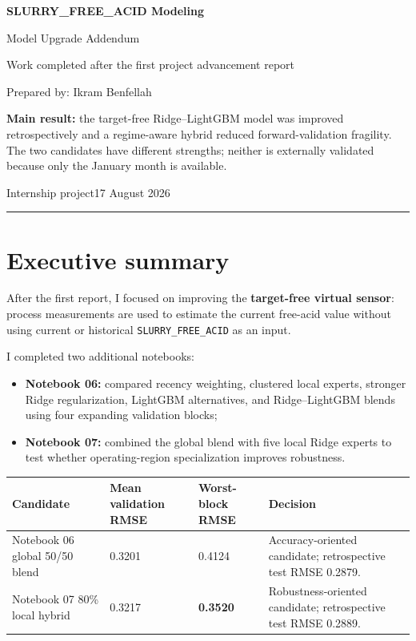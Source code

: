 \documentclass[10pt,a4paper]{article}
\newcommand{\statusbox}[1]{\colorbox{Light}{\parbox{0.96\linewidth}{#1}}
}
\begin{document}
\begin{titlepage}
  \color{Navy}
  \vspace*{2.3cm}
  {\Huge\bfseries SLURRY\_FREE\_ACID Modeling\par}
  \vspace{0.35cm}
  {\LARGE Model Upgrade Addendum\par}
  \vspace{0.7cm}
  {\large Work completed after the first project advancement report\par}
  \vspace{1.0cm}
  {\large Prepared by: Ikram Benfellah\par}
  \vfill
  \statusbox{\textbf{Main result:} the target-free Ridge--LightGBM model was improved retrospectively and a regime-aware hybrid reduced forward-validation fragility. The two candidates have different strengths; neither is externally validated because only the January month is available.}
  \vfill
  {\large Internship project\hfill 17 August 2026}
  \vspace{0.3cm}
  \color{Gold}\rule{\textwidth}{4pt}
\end{titlepage}

\section*{Executive summary}

After the first report, I focused on improving the \textbf{target-free virtual sensor}: process measurements are used to estimate the current free-acid value without using current or historical \texttt{SLURRY\_FREE\_ACID} as an input.

I completed two additional notebooks:
\begin{itemize}
  \item \textbf{Notebook 06:} compared recency weighting, clustered local experts, stronger Ridge regularization, LightGBM alternatives, and Ridge--LightGBM blends using four expanding validation blocks;
  \item \textbf{Notebook 07:} combined the global blend with five local Ridge experts to test whether operating-region specialization improves robustness.
\end{itemize}

\begin{tabularx}{\textwidth}{L{0.25\textwidth}L{0.18\textwidth}L{0.18\textwidth}Y}
\toprule
\textbf{Candidate} & \textbf{Mean validation RMSE} & \textbf{Worst-block RMSE} & \textbf{Decision} \\
\midrule
Notebook 06 global 50/50 blend & 0.3201 & 0.4124 & Accuracy-oriented candidate; retrospective test RMSE 0.2879. \\
Notebook 07 80\% local hybrid & 0.3217 & \textbf{0.3520} & Robustness-oriented candidate; retrospective test RMSE 0.2889. \\
\bottomrule
\end{tabularx}
\end{document}
